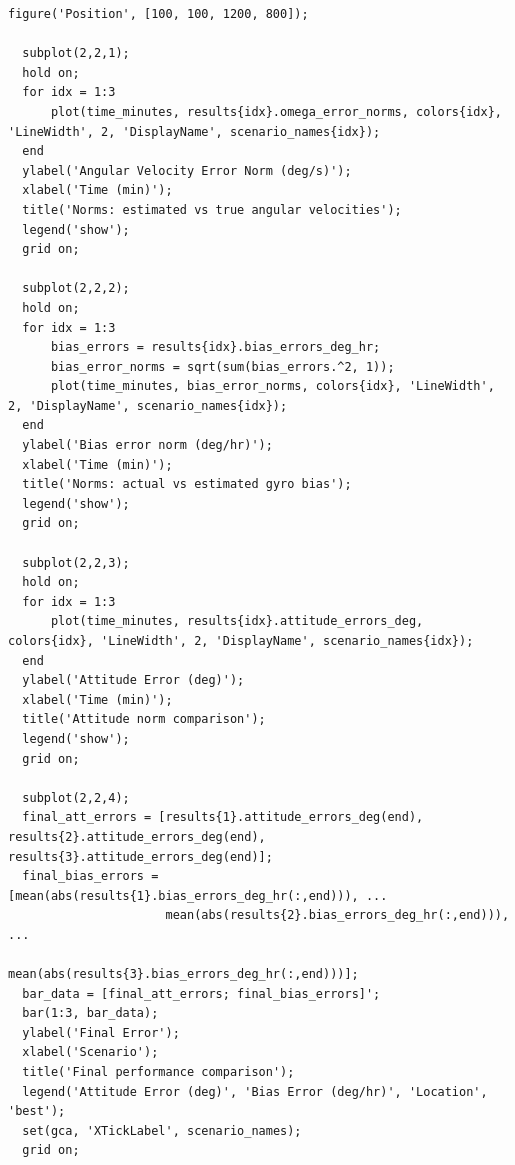 \documentclass[12pt,A4, onecolumn]{exam}
\begin{document}
\begin{questions}
\begin{lstlisting}[style=matlabstyle]
  figure('Position', [100, 100, 1200, 800]);

  subplot(2,2,1);
  hold on;
  for idx = 1:3
      plot(time_minutes, results{idx}.omega_error_norms, colors{idx}, 'LineWidth', 2, 'DisplayName', scenario_names{idx});
  end
  ylabel('Angular Velocity Error Norm (deg/s)');
  xlabel('Time (min)');
  title('Norms: estimated vs true angular velocities');
  legend('show');
  grid on;

  subplot(2,2,2);
  hold on;
  for idx = 1:3
      bias_errors = results{idx}.bias_errors_deg_hr;
      bias_error_norms = sqrt(sum(bias_errors.^2, 1));
      plot(time_minutes, bias_error_norms, colors{idx}, 'LineWidth', 2, 'DisplayName', scenario_names{idx});
  end
  ylabel('Bias error norm (deg/hr)');
  xlabel('Time (min)');
  title('Norms: actual vs estimated gyro bias');
  legend('show');
  grid on;

  subplot(2,2,3);
  hold on;
  for idx = 1:3
      plot(time_minutes, results{idx}.attitude_errors_deg, colors{idx}, 'LineWidth', 2, 'DisplayName', scenario_names{idx});
  end
  ylabel('Attitude Error (deg)');
  xlabel('Time (min)');
  title('Attitude norm comparison');
  legend('show');
  grid on;

  subplot(2,2,4);
  final_att_errors = [results{1}.attitude_errors_deg(end), results{2}.attitude_errors_deg(end), results{3}.attitude_errors_deg(end)];
  final_bias_errors = [mean(abs(results{1}.bias_errors_deg_hr(:,end))), ...
                      mean(abs(results{2}.bias_errors_deg_hr(:,end))), ...
                      mean(abs(results{3}.bias_errors_deg_hr(:,end)))];
  bar_data = [final_att_errors; final_bias_errors]';
  bar(1:3, bar_data);
  ylabel('Final Error');
  xlabel('Scenario');
  title('Final performance comparison');
  legend('Attitude Error (deg)', 'Bias Error (deg/hr)', 'Location', 'best');
  set(gca, 'XTickLabel', scenario_names);
  grid on;
\end{lstlisting}



\end{questions}
\end{document}
